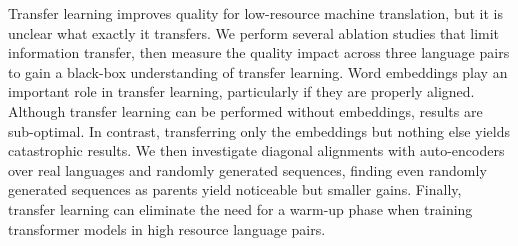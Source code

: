 Transfer learning improves quality for low-resource machine translation, but it is unclear what exactly it transfers. We perform several ablation studies that limit information transfer, then measure the quality impact across three language pairs to gain a black-box understanding of transfer learning.  Word embeddings play an important role in transfer learning, particularly if they are properly aligned.  Although transfer learning can be performed without embeddings, results are sub-optimal. In contrast, transferring only the embeddings but nothing else yields catastrophic results. We then investigate diagonal alignments with auto-encoders over real languages and randomly generated sequences, finding even randomly generated sequences as parents yield noticeable but smaller gains. Finally, transfer learning can eliminate the need for a warm-up phase when training transformer models in high resource language pairs.
